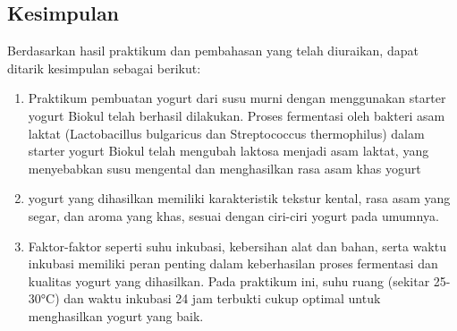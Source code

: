 \documentclass[a4paper,12pt, left=3cm,right=2cm,bottom=2cm, bahasa]{article}
\begin{document}
\subsection{Kesimpulan}
Berdasarkan hasil praktikum dan pembahasan yang telah diuraikan, dapat ditarik kesimpulan sebagai berikut:
\begin{enumerate}
  \item Praktikum pembuatan yogurt dari susu murni dengan menggunakan starter yogurt Biokul telah berhasil dilakukan.  Proses fermentasi oleh bakteri asam laktat (Lactobacillus bulgaricus dan Streptococcus thermophilus) dalam starter yogurt Biokul telah mengubah laktosa menjadi asam laktat, yang menyebabkan susu mengental dan menghasilkan rasa asam khas yogurt 
  \item yogurt yang dihasilkan memiliki karakteristik tekstur kental, rasa asam yang segar, dan aroma yang khas, sesuai dengan ciri-ciri yogurt pada umumnya.
  \item Faktor-faktor seperti suhu inkubasi, kebersihan alat dan bahan, serta waktu inkubasi memiliki peran penting dalam keberhasilan proses fermentasi dan kualitas yogurt yang dihasilkan.  Pada praktikum ini, suhu ruang (sekitar 25-30°C) dan waktu inkubasi 24 jam terbukti cukup optimal untuk menghasilkan yogurt yang baik.
\end{enumerate}
\end{document}
